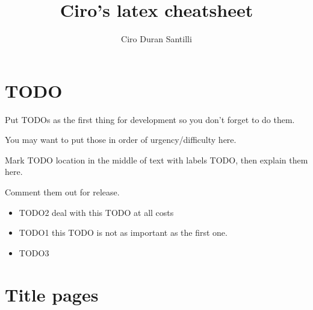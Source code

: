 \documentclass[12pt]{article}
\title{Ciro's latex cheatsheet}
\author{Ciro Duran Santilli}
\begin{document}
\tableofcontents
\newpage

\section{TODO}

\begin{remark}
	Put TODOs as the first \label{TODO2} thing for development so you don't forget to do them.
	
	You may want to put those in order of urgency/difficulty here.
	
	Mark TODO location in \label{TODO1} the middle of text with labels TODO, then explain them here.
	
	Comment them out for release.
\end{remark}

\begin{itemize}
  \item TODO2 deal with this TODO at all costs
  \item TODO1 this TODO is not as important as the first one.
  \item TODO3
\end{itemize}

\section{Title pages} \label{title-pages}

\maketitle
\newpage
\end{document}
